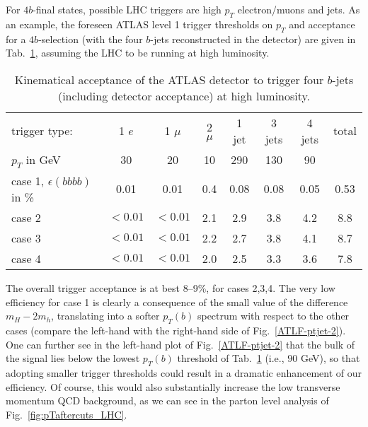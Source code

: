 For $4b$-final states, possible LHC triggers are high $p_T$
electron/muons and jets. As an example, the foreseen ATLAS level 1 trigger
thresholds on $p_T$ and acceptance for a
$4b$-selection (with the four $b$-jets reconstructed in the detector)
are given in Tab.~\ref{tab:btag}, assuming the LHC
to be running at high luminosity.

\begin{table}[!ht]
\begin{center}
\begin{tabular}{|l||c|c|c|c|c|c|c|} \hline
trigger type: & 1 $e$ &  1 $\mu$  & 2 $\mu$ & 1 jet & 3 jets & 4 jets & total\\
$p_T$ in GeV & 30 & 20 & 10 & 290 & 130 & 90 & \\  \hline
case 1, $\epsilon(bbbb)$ in \% & 0.01 & 0.01 & 0.4 & 0.08 & 0.08 & 0.05 & 
0.53 \\ \hline
case 2 & $<0.01$ & $<0.01$ & 2.1 & 2.9 & 3.8 & 4.2 & 8.8\\ \hline
case 3 & $<0.01$ & $<0.01$ & 2.2 & 2.7 & 3.8 & 4.1 & 8.7\\ \hline
case 4 & $<0.01$ & $<0.01$ & 2.0 & 2.5 & 3.3 & 3.6 & 7.8\\ \hline
\end{tabular}
\caption{Kinematical
acceptance of the ATLAS detector to trigger four
$b$-jets 
 (including  detector acceptance) at high luminosity.
}
\label{tab:btag}
\end{center}
\end{table}

\noindent
The overall trigger acceptance is at best 8--9\%,
 for cases 2,3,4. The very low efficiency for case 1 is
clearly a consequence of the small value of the difference $m_H-2m_h$,
translating into a softer $p_T(b)$ spectrum with respect to the other
cases (compare the left-hand with the right-hand
side of Fig.~\ref{ATLF-ptjet-2}).
One can further see in the left-hand plot of Fig.~\ref{ATLF-ptjet-2} that 
the bulk of the signal lies below the lowest $p_T(b)$ threshold
of Tab.~\ref{tab:btag} (i.e., $90$ GeV), so that adopting smaller 
trigger thresholds could result in a
dramatic enhancement of our efficiency. Of course, this 
would also substantially increase the low transverse momentum QCD
background, as we can see in the parton level analysis of
Fig.~\ref{fig:pTaftercuts_LHC}. 

